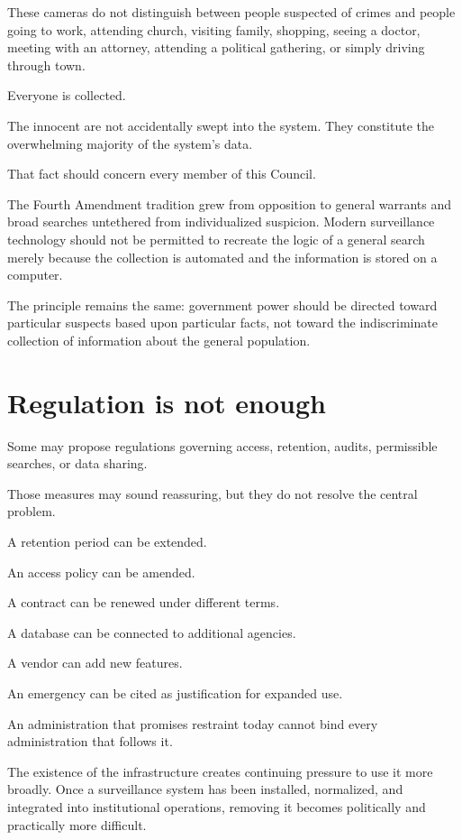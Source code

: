\documentclass[11pt]{article}
\begin{document}
These cameras do not distinguish between people suspected of crimes and people going to work, attending church, visiting family, shopping, seeing a doctor, meeting with an attorney, attending a political gathering, or simply driving through town.

Everyone is collected.

The innocent are not accidentally swept into the system. They constitute the overwhelming majority of the system’s data.

That fact should concern every member of this Council.

The Fourth Amendment tradition grew from opposition to general warrants and broad searches untethered from individualized suspicion. Modern surveillance technology should not be permitted to recreate the logic of a general search merely because the collection is automated and the information is stored on a computer.

The principle remains the same: government power should be directed toward particular suspects based upon particular facts, not toward the indiscriminate collection of information about the general population.

\section*{Regulation is not enough}
\label{sec:orgee69f0e}

Some may propose regulations governing access, retention, audits, permissible searches, or data sharing.

Those measures may sound reassuring, but they do not resolve the central problem.

A retention period can be extended.

An access policy can be amended.

A contract can be renewed under different terms.

A database can be connected to additional agencies.

A vendor can add new features.

An emergency can be cited as justification for expanded use.

An administration that promises restraint today cannot bind every administration that follows it.

The existence of the infrastructure creates continuing pressure to use it more broadly. Once a surveillance system has been installed, normalized, and integrated into institutional operations, removing it becomes politically and practically more difficult.
\end{document}

